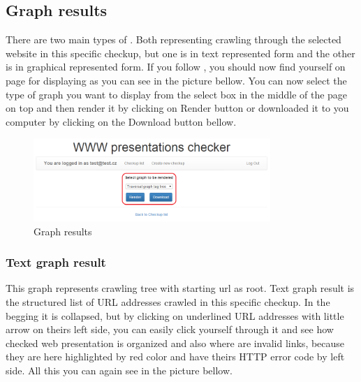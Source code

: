 \documentclass[12pt,a4paper]{article}
\begin{document}
\subsection{Graph results} \label{graph}
There are two main types of . Both representing crawling through the selected website in this specific checkup, but one  is in text represented form and the other  is in graphical represented form. If you follow , you should now find yourself on page for displaying  as you can see in the picture bellow. You can now select the type of graph you want to display from the select box in the middle of the page on top and then render it by clicking on Render button or downloaded it to you computer by clicking on the Download button bellow.

\begin{figure}[H]
    \centering
    \includegraphics[width=0.8\textwidth]{pictures/graph.png}
		\caption{Graph results}
		\label{fig:graph}
\end{figure}

\subsubsection{Text graph result} \label{text}
This graph represents crawling tree with starting url as root. Text graph result is the structured list of URL addresses crawled in this specific checkup. In the begging it is collapsed, but by clicking on underlined URL addresses with little arrow on theirs left side, you can easily click yourself through it and see how checked web presentation is organized and also where are invalid links, because they are here highlighted by red color and have theirs HTTP error code by left side. All this you can again see in the picture bellow.
\end{document}
